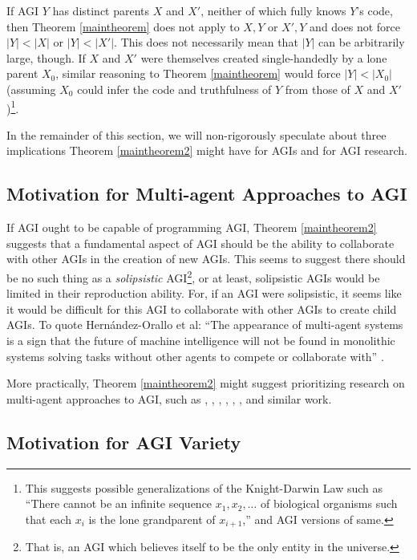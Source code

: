 \documentclass[runningheads]{llncs}
\begin{document}
If AGI $Y$ has distinct parents $X$ and $X'$, neither of which fully knows
$Y$'s code, then Theorem \ref{maintheorem} does not apply to $X,Y$ or $X',Y$ and
does not force
$|Y|<|X|$ or $|Y|<|X'|$. This does not necessarily mean that
$|Y|$ can be arbitrarily large, though. If $X$ and $X'$ were themselves
created single-handedly by a lone parent $X_0$, similar
reasoning to Theorem \ref{maintheorem} would force $|Y|<|X_0|$ (assuming $X_0$
could infer the code and truthfulness of $Y$ from those of $X$ and $X'$)\footnote{This
suggests possible generalizations of the Knight-Darwin Law such as ``There cannot be
an infinite sequence $x_1,x_2,\ldots$ of biological organisms such that each $x_i$
is the lone grandparent of $x_{i+1}$,'' and AGI versions of same.}.

In the remainder of this section, we will non-rigorously speculate about three implications
Theorem \ref{maintheorem2} might have for AGIs and for AGI research.


\subsection{Motivation for Multi-agent Approaches to AGI}

If AGI ought to be capable of programming AGI,
Theorem \ref{maintheorem2} suggests
that a fundamental aspect of AGI should be the ability to collaborate with other
AGIs in the creation of new AGIs.
This seems to suggest there should be no
such thing as a \emph{solipsistic} AGI\footnote{That is, an AGI which believes itself
to be the only entity in the universe.}, or at least, solipsistic AGIs would be
limited in their reproduction ability.
For, if an AGI were solipsistic, it
seems like it would be difficult for this AGI to collaborate with other AGIs
to create child AGIs.
To quote Hern{\'a}ndez-Orallo et al: ``The appearance of multi-agent systems is a sign that
the future of machine intelligence will not be found in monolithic systems
solving tasks without other agents to compete or collaborate with''
\cite{hernandez2011more}.

More practically,
Theorem \ref{maintheorem2} might suggest
prioritizing research on multi-agent approaches to AGI, such as
\cite{castelfranchi1998modelling}, \cite{hernandez2011more},
\cite{hibbard2011societies},
\cite{kolonin2018reputation},
\cite{potyka2016group},
\cite{thorisson2004constructionist},
and similar work.

\subsection{Motivation for AGI Variety}
\end{document}
